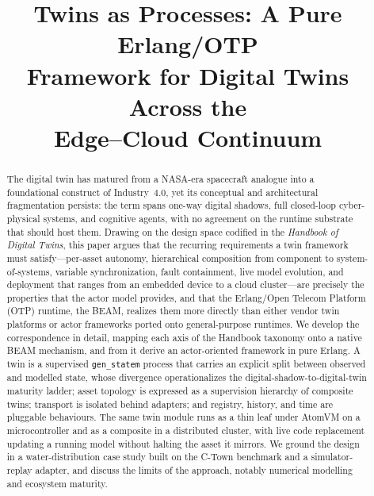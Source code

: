 \documentclass[conference]{IEEEtran}
\newcommand{\beam}{BEAM\xspace}
\newcommand{\otp}{OTP\xspace}
\begin{document}
\title{Twins as Processes: A Pure Erlang/OTP\\ Framework for Digital Twins Across the\\ Edge--Cloud Continuum}

\author{
}

\maketitle

\begin{abstract}
The digital twin has matured from a NASA-era spacecraft analogue into a
foundational construct of Industry~4.0, yet its conceptual and architectural
fragmentation persists: the term spans one-way digital shadows, full
closed-loop cyber-physical systems, and cognitive agents, with no agreement on
the runtime substrate that should host them. Drawing on the design space
codified in the \emph{Handbook of Digital Twins}, this paper argues that the
recurring requirements a twin framework must satisfy---per-asset autonomy,
hierarchical composition from component to system-of-systems, variable
synchronization, fault containment, live model evolution, and deployment that
ranges from an embedded device to a cloud cluster---are precisely the
properties that the actor model provides, and that the Erlang/Open Telecom
Platform (\otp) runtime, the \beam, realizes them more directly than either
vendor twin platforms or actor frameworks ported onto general-purpose runtimes.
We develop the correspondence in detail, mapping each axis of the Handbook
taxonomy onto a native \beam mechanism, and from it derive an actor-oriented
framework in pure Erlang. A twin is a supervised \texttt{gen\_statem} process
that carries an explicit split between observed and modelled state, whose
divergence operationalizes the digital-shadow-to-digital-twin maturity ladder;
asset topology is expressed as a supervision hierarchy of composite twins;
transport is isolated behind adapters; and registry, history, and time are
pluggable behaviours. The same twin module runs as a thin leaf under AtomVM on
a microcontroller and as a composite in a distributed cluster, with live code
replacement updating a running model without halting the asset it mirrors. We
ground the design in a water-distribution case study built on the C-Town
benchmark and a simulator-replay adapter, and discuss the limits of the
approach, notably numerical modelling and ecosystem maturity.
\end{abstract}
\end{document}
